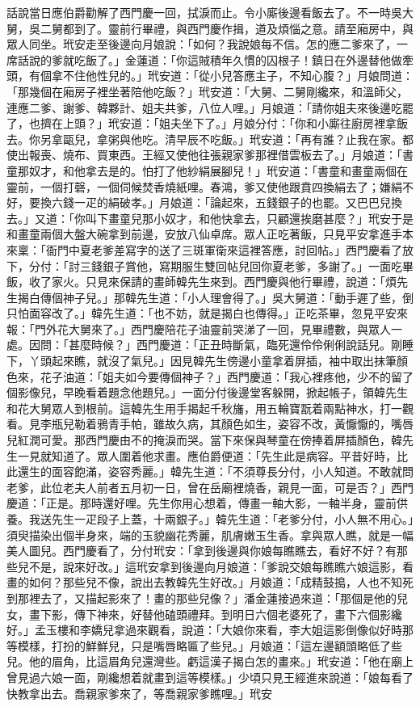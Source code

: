 \begin{showcontents}{}
話說當日應伯爵勸解了西門慶一回，拭淚而止。令小廝後邊看飯去了。不一時吳大舅，吳二舅都到了。靈前行畢禮，與西門慶作揖，道及煩惱之意。請至廂房中，與眾人同坐。玳安走至後邊向月娘說：「如何？我說娘每不信。怎的應二爹來了，一席話說的爹就吃飯了。」金蓮道：「你這賊積年久慣的囚根子！鎮日在外邊替他做牽頭，有個拿不住他性兒的。」玳安道：「從小兒答應主子，不知心腹？」月娘問道：「那幾個在廂房子裡坐著陪他吃飯？」玳安道：「大舅、二舅剛纔來，和溫師父，連應二爹、謝爹、韓夥計、姐夫共爹，八位人哩。」月娘道：「請你姐夫來後邊吃罷了，也擠在上頭？」玳安道：「姐夫坐下了。」月娘分付：「你和小廝往廚房裡拿飯去。你另拿甌兒，拿粥與他吃。清早辰不吃飯。」玳安道：「再有誰？止我在家。都使出報喪、燒布、買東西。王經又使他往張親家爹那裡借雲板去了。」月娘道：「書童那奴才，和他拿去是的。怕打了他紗絹展腳兒！」玳安道：「書童和畫童兩個在靈前，一個打磬，一個伺候焚香燒紙哩。春鴻，爹又使他跟賁四換絹去了；嫌絹不好，要換六錢一疋的絹破孝。」月娘道：「論起來，五錢銀子的也罷。又巴巴兒換去。」又道：「你叫下畫童兒那小奴才，和他快拿去，只顧還挨磨甚麼？」玳安于是和畫童兩個大盤大碗拿到前邊，安放八仙卓席。眾人正吃著飯，只見平安拿進手本來稟：「衙門中夏老爹差寫字的送了三斑軍衛來這裡答應，討回帖。」西門慶看了放下，分付：「討三錢銀子賞他，寫期服生雙回帖兒回你夏老爹，多謝了。」一面吃畢飯，收了家火。只見來保請的畫師韓先生來到。西門慶與他行畢禮，說道：「煩先生揭白傳個神子兒。」那韓先生道：「小人理會得了。」吳大舅道：「動手遲了些，倒只怕面容改了。」韓先生道：「也不妨，就是揭白也傳得。」正吃茶畢，忽見平安來報：「門外花大舅來了。」西門慶陪花子油靈前哭涕了一回，見畢禮數，與眾人一處。因問：「甚麼時候？」西門慶道：「正丑時斷氣，臨死還伶伶俐俐說話兒。剛睡下，丫頭起來瞧，就沒了氣兒。」因見韓先生傍邊小童拿着屏插，袖中取出抹筆顏色來，花子油道：「姐夫如今要傳個神子？」西門慶道：「我心裡疼他，少不的留了個影像兒，早晚看着題念他題兒。」一面分付後邊堂客躲開，掀起帳子，領韓先生和花大舅眾人到根前。這韓先生用手揭起千秋旛，用五輪寶翫着兩點神水，打一觀看。見李瓶兒勒着鴉青手帕，雖故久病，其顏色如生，姿容不改，黃懨懨的，嘴唇兒紅潤可愛。那西門慶由不的掩淚而哭。當下來保與琴童在傍捧着屏插顏色，韓先生一見就知道了。眾人圍着他求畫。應伯爵便道：「先生此是病容。平昔好時，比此還生的面容飽滿，姿容秀麗。」韓先生道：「不須尊長分付，小人知道。不敢就問老爹，此位老夫人前者五月初一日，曾在岳廟裡燒香，親見一面，可是否？」西門慶道：「正是。那時還好哩。先生你用心想着，傳畫一軸大影，一軸半身，靈前供養。我送先生一疋段子上蓋，十兩銀子。」韓先生道：「老爹分付，小人無不用心。」須臾描染出個半身來，端的玉貌幽花秀麗，肌膚嫩玉生香。拿與眾人瞧，就是一幅美人圖兒。西門慶看了，分付玳安：「拿到後邊與你娘每瞧瞧去，看好不好？有那些兒不是，說來好改。」這玳安拿到後邊向月娘道：「爹說交娘每瞧瞧六娘這影，看畫的如何？那些兒不像，說出去教韓先生好改。」月娘道：「成精鼓搗，人也不知死到那裡去了，又描起影來了！畫的那些兒像？」潘金蓮接過來道：「那個是他的兒女，畫下影，傳下神來，好替他磕頭禮拜。到明日六個老婆死了，畫下六個影纔好。」孟玉樓和李嬌兒拿過來觀看，說道：「大娘你來看，李大姐這影倒像似好時那等模樣，打扮的鮮鮮兒，只是嘴唇略匾了些兒。」月娘道：「這左邊額頭略低了些兒。他的眉角，比這眉角兒還灣些。虧這漢子揭白怎的畫來。」玳安道：「他在廟上曾見過六娘一面，剛纔想着就畫到這等模樣。」少頃只見王經進來說道：「娘每看了快教拿出去。喬親家爹來了，等喬親家爹瞧哩。」玳安
\end{showcontents}
